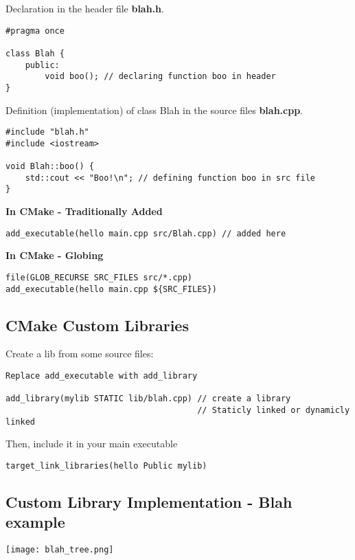 Declaration in the header file \textbf{blah.h}.
\begin{verbatim}
#pragma once

class Blah {
    public:
        void boo(); // declaring function boo in header
}
\end{verbatim}

Definition (implementation) of class Blah in the source files \textbf{blah.cpp}.
\begin{verbatim}
#include "blah.h"
#include <iostream>

void Blah::boo() {
    std::cout << "Boo!\n"; // defining function boo in src file
}
\end{verbatim}

\textbf{In CMake - Traditionally Added}
\begin{verbatim}
add_executable(hello main.cpp src/Blah.cpp) // added here
\end{verbatim}

\textbf{In CMake - Globing}
\begin{verbatim}
file(GLOB_RECURSE SRC_FILES src/*.cpp)
add_executable(hello main.cpp ${SRC_FILES})
\end{verbatim}

\subsection{CMake Custom Libraries}

Create a lib from some source files:

\begin{verbatim}
Replace add_executable with add_library

add_library(mylib STATIC lib/blah.cpp) // create a library
                                       // Staticly linked or dynamicly linked
\end{verbatim}

Then, include it in your main executable
\begin{verbatim}
target_link_libraries(hello Public mylib)
\end{verbatim}

\subsection{Custom Library Implementation - Blah example}

\begin{center}
    \texttt{[image: blah\_tree.png]}
\end{center}

